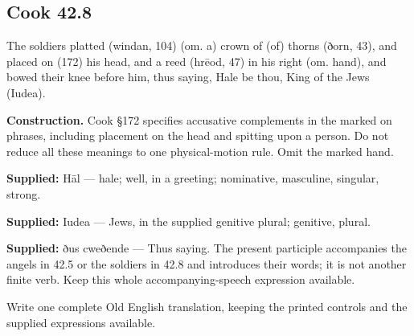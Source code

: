 \par\begin{minipage}{\linewidth}\raggedright
\subsection*{Cook 42.8}

The soldiers platted (windan, 104) (om. a) crown of (of) thorns (ðorn, 43), and placed on (172) his head, and a reed (hrēod, 47) in his right (om. hand), and bowed their knee before him, thus saying, Hale be thou, King of the Jews (Iudea).

\textbf{Construction.} Cook §172 specifies accusative complements in the marked on phrases, including placement on the head and spitting upon a person. Do not reduce all these meanings to one physical-motion rule. Omit the marked hand.

\end{minipage}\par\addvspace{4pt}

\textbf{Supplied:} Hāl — hale; well, in a greeting; nominative, masculine, singular, strong.

\textbf{Supplied:} Iudea — Jews, in the supplied genitive plural; genitive, plural.

\textbf{Supplied:} ðus cweðende — Thus saying. The present participle accompanies the angels in 42.5 or the soldiers in 42.8 and introduces their words; it is not another finite verb. Keep this whole accompanying-speech expression available.

Write one complete Old English translation, keeping the printed controls and the supplied expressions available.

